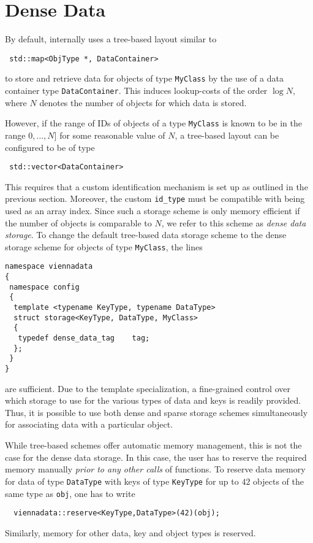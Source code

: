 \section{Dense Data} \label{sec:dense-data}
By default, {\ViennaData} internally uses a tree-based layout similar to
\begin{lstlisting}
 std::map<ObjType *, DataContainer>
\end{lstlisting}
to store and retrieve data for objects of type \lstinline|MyClass| by the use of a data container type \lstinline|DataContainer|.
This induces lookup-costs of the order $\log N$, where $N$ denotes the number of objects for which data is stored.

However, if the range of IDs of objects of a type \lstinline|MyClass| is known to be in the range $0, \ldots, N]$ for some reasonable value of $N$,
a tree-based layout can be configured to be of type
\begin{lstlisting}
 std::vector<DataContainer>
\end{lstlisting}
This requires that a custom identification mechanism is set up as outlined in the previous section. Moreover, the 
custom \lstinline|id_type| must be compatible with being used as an array index. Since such a storage scheme is only memory efficient
if the number of objects is comparable to $N$, we refer to this scheme as \emph{dense data storage}.
To change the default tree-based data storage scheme to the dense storage scheme for objects of type \lstinline|MyClass|, the lines
\begin{lstlisting}
namespace viennadata
{
 namespace config
 {
  template <typename KeyType, typename DataType>
  struct storage<KeyType, DataType, MyClass>
  {
   typedef dense_data_tag    tag;
  };
 }
}
\end{lstlisting}
are sufficient. Due to the template specialization, a fine-grained control over which storage to use for the various types of data and keys is readily provided. Thus, it is possible to use both dense and sparse storage schemes simultaneously for associating data with a particular object.

While tree-based schemes offer automatic memory management, this is not the case for the dense data storage. In this case, 
the user has to reserve the required memory manually \emph{prior to any other calls} of {\ViennaData} functions.
To reserve data memory for data of type \lstinline|DataType| with keys of type \lstinline|KeyType| for up to $42$ objects of the same type as \lstinline|obj|,
one has to write
\begin{lstlisting}
  viennadata::reserve<KeyType,DataType>(42)(obj);
\end{lstlisting}
Similarly, memory for other data, key and object types is reserved.


